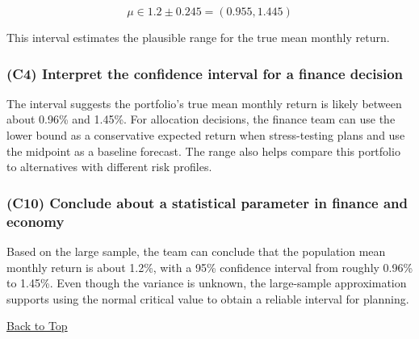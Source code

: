 \[
\mu \in 1.2 \pm 0.245 = (0.955, 1.445)
\]

This interval estimates the plausible range for the true mean monthly return.

\subsubsection{(C4) Interpret the confidence interval for a finance decision}\label{subsubsec:interval-example2-c4}

The interval suggests the portfolio's true mean monthly return is likely between about 0.96\% and 1.45\%. For allocation decisions, the finance team can use the lower bound as a conservative expected return when stress-testing plans and use the midpoint as a baseline forecast. The range also helps compare this portfolio to alternatives with different risk profiles.

\subsubsection{(C10) Conclude about a statistical parameter in finance and economy}\label{subsubsec:interval-example2-c10}

Based on the large sample, the team can conclude that the population mean monthly return is about 1.2\%, with a 95\% confidence interval from roughly 0.96\% to 1.45\%. Even though the variance is unknown, the large-sample approximation supports using the normal critical value to obtain a reliable interval for planning.

\vspace{6pt}
\noindent\hyperref[table-of-contents]{Back to Top}
